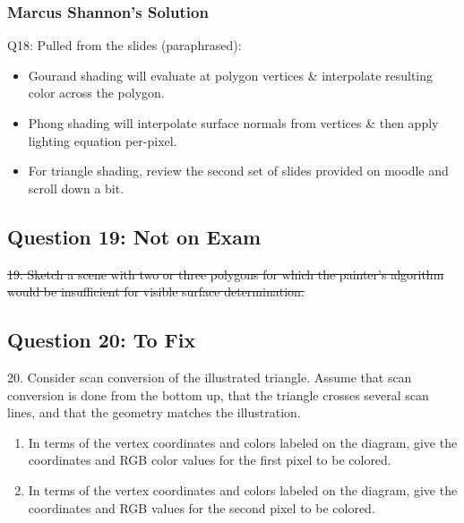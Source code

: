 \documentclass[11pt]{article}
\begin{document}
\begin{spacing}{1.2}
\subsubsection{Marcus Shannon's Solution}

Q18: Pulled from the slides (paraphrased):
\begin{itemize}
    \item Gourand shading will evaluate at polygon vertices \& interpolate resulting color across the polygon.
    \item Phong shading will interpolate surface normals from vertices \& then apply lighting equation per-pixel.
    \item For triangle shading, review the second set of slides provided on moodle and scroll down a bit.
\end{itemize}


\subsection{Question 19:  Not on Exam}
\sout{19.  Sketch a scene with two or three polygons for which the painter's algorithm would be insufficient for visible surface determination.  }

\subsection{Question 20:  To Fix}
20.  Consider scan conversion of the illustrated triangle.  Assume that scan conversion is done from the bottom up, that the triangle crosses several scan lines, and that the geometry matches the illustration.  


\begin{enumerate}[label=\arabic*)]
	\item In terms of the vertex coordinates and colors labeled on the diagram, give the coordinates and RGB color values for the first pixel to be colored.  
	\item In terms of the vertex coordinates and colors labeled on the diagram, give the coordinates and RGB values for the second pixel to be colored.  
\end{enumerate}


\end{spacing}
\end{document}
